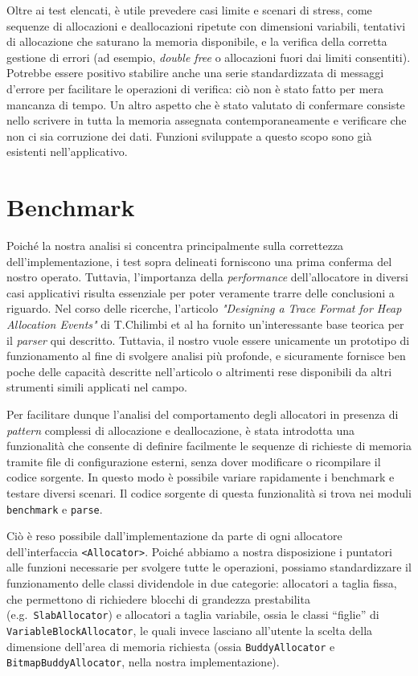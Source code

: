 Oltre ai test elencati, è utile prevedere casi limite e scenari di stress, come sequenze di allocazioni e deallocazioni ripetute con dimensioni variabili, tentativi di allocazione che saturano la memoria disponibile, e la verifica della corretta gestione di errori (ad esempio, \textit{double free} o allocazioni fuori dai limiti consentiti). Potrebbe essere positivo stabilire anche una serie standardizzata di messaggi d'errore per facilitare le operazioni di verifica: ciò non è stato fatto per mera mancanza di tempo. Un altro aspetto che è stato valutato di confermare consiste nello scrivere in tutta la memoria assegnata contemporaneamente e verificare che non ci sia corruzione dei dati. Funzioni sviluppate a questo scopo sono già esistenti nell'applicativo.

\section{Benchmark}
Poiché la nostra analisi si concentra principalmente sulla correttezza dell'implementazione, i test sopra delineati forniscono una prima conferma del nostro operato. Tuttavia, l'importanza della \textit{performance} dell'allocatore in diversi casi applicativi risulta essenziale per poter veramente trarre delle conclusioni a riguardo. 
Nel corso delle ricerche, l'articolo \textit{"Designing a Trace Format for Heap Allocation Events"}\cite{chilimbi2000} di T.Chilimbi et al ha fornito un'interessante base teorica per il \textit{parser} qui descritto. Tuttavia, il nostro vuole essere unicamente un prototipo di funzionamento al fine di svolgere analisi più profonde, e sicuramente fornisce ben poche delle capacità descritte nell'articolo o altrimenti rese disponibili da altri strumenti simili applicati nel campo.\footnotemark


Per facilitare dunque l’analisi del comportamento degli allocatori in presenza di \textit{pattern} complessi di allocazione e deallocazione, è stata introdotta una funzionalità che consente di definire facilmente le sequenze di richieste di memoria tramite file di configurazione esterni, senza dover modificare o ricompilare il codice sorgente. In questo modo è possibile variare rapidamente i benchmark e testare diversi scenari. Il codice sorgente di questa funzionalità si trova nei moduli \texttt{benchmark} e \texttt{parse}.

Ciò è reso possibile dall’implementazione da parte di ogni allocatore dell’interfaccia \texttt{<Allocator>}. Poiché abbiamo a nostra disposizione i puntatori alle funzioni necessarie per svolgere tutte le operazioni, possiamo standardizzare il funzionamento delle classi dividendole in due categorie: allocatori a taglia fissa, che permettono di richiedere blocchi di grandezza prestabilita (e.g.\ \texttt{SlabAllocator}) e allocatori a taglia variabile, ossia le classi “figlie” di \texttt{VariableBlockAllocator}, le quali invece lasciano all’utente la scelta della dimensione dell’area di memoria richiesta (ossia \texttt{BuddyAllocator} e \texttt{BitmapBuddyAllocator}, nella nostra implementazione).

